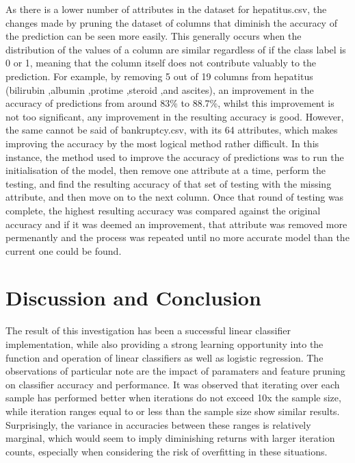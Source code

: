 As there is a lower number of attributes in the dataset for hepatitus.csv, the changes made by pruning the dataset of columns that diminish the accuracy of the prediction can be seen more easily. This generally occurs when the distribution of the values of a column are similar regardless of if the class label is 0 or 1, meaning that the column itself does not contribute valuably to the prediction. For example, by removing 5 out of 19 columns from hepatitus (bilirubin ,albumin ,protime ,steroid ,and ascites), an improvement in the accuracy of predictions from around 83\% to 88.7\%, whilst this improvement is not too significant, any improvement in the resulting accuracy is good. However, the same cannot be said of bankruptcy.csv, with its 64 attributes, which makes improving the accuracy by the most logical method rather difficult. In this instance, the method used to improve the accuracy of predictions was to run the initialisation of the model, then remove one attribute at a time, perform the testing, and find the resulting accuracy of that set of testing with the missing attribute, and then move on to the next column. Once that round of testing was complete, the highest resulting accuracy was compared against the original accuracy and if it was deemed an improvement, that attribute was removed more permenantly and the process was repeated until no more accurate model than the current one could be found.\\

\section{Discussion and Conclusion}

The result of this investigation has been a successful linear classifier implementation, while also providing a strong learning opportunity into the function and operation of linear classifiers as well as logistic regression. The observations of particular note are the impact of paramaters and feature pruning on classifier accuracy and performance. It was observed that iterating over each sample has performed better when iterations do not exceed 10x the sample size, while iteration ranges equal to or less than the sample size show similar results. Surprisingly, the variance in accuracies between these ranges is relatively marginal, which would seem to imply diminishing returns with larger iteration counts, especially when considering the risk of overfitting in these situations.\\


